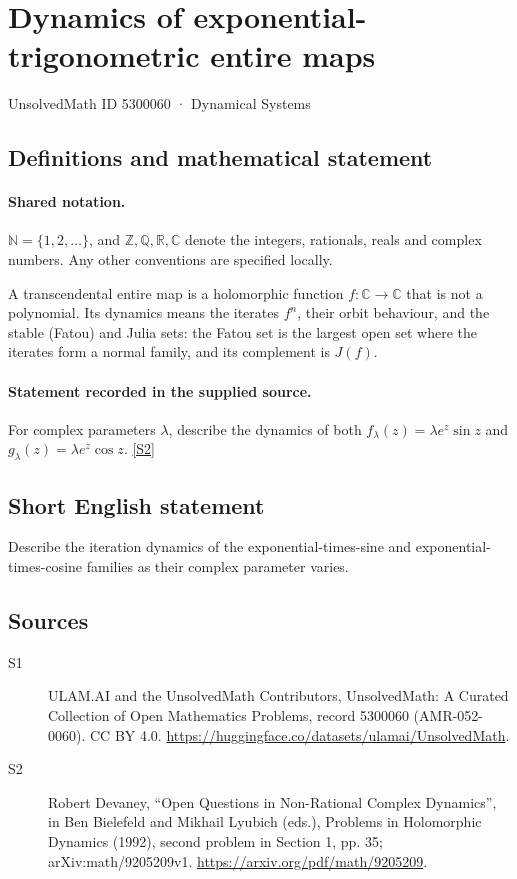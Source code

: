 \documentclass[11pt]{article}
\newcommand{\sref}[2]{\hyperlink{source:#1:#2}{[S#2]}}
\begin{document}
\setcounter{section}{5300059}
\section{Dynamics of exponential-trigonometric entire maps}\label{5300060}
{\small\sffamily UnsolvedMath ID 5300060 · Dynamical Systems}
\subsection{Definitions and mathematical statement}

\paragraph{Shared notation.}$\mathbb N=\{1,2,\ldots\}$, and $\mathbb Z,\mathbb Q,\mathbb R,\mathbb C$ denote the integers, rationals, reals and complex numbers. Any other conventions are specified locally.


A transcendental entire map is a holomorphic function $f:\mathbb C\to\mathbb C$ that is not a polynomial. Its dynamics means the iterates $f^n$, their orbit behaviour, and the stable (Fatou) and Julia sets: the Fatou set is the largest open set where the iterates form a normal family, and its complement is $J(f)$.
\paragraph{Statement recorded in the supplied source.}
For complex parameters $\lambda$, describe the dynamics of both $f_\lambda(z)=\lambda e^z\sin z$ and $g_\lambda(z)=\lambda e^z\cos z$. \sref{5300060}{2}
\subsection{Short English statement}
Describe the iteration dynamics of the exponential-times-sine and exponential-times-cosine families as their complex parameter varies.
\subsection{Sources}
\begin{description}
\item[\hypertarget{source:5300060:1}{S1}] ULAM.AI and the UnsolvedMath Contributors, UnsolvedMath: A Curated Collection of Open Mathematics Problems, record 5300060 (AMR-052-0060). CC BY 4.0. \url{https://huggingface.co/datasets/ulamai/UnsolvedMath}.
\item[\hypertarget{source:5300060:2}{S2}] Robert Devaney, ``Open Questions in Non-Rational Complex Dynamics'', in Ben Bielefeld and Mikhail Lyubich (eds.), Problems in Holomorphic Dynamics (1992), second problem in Section 1, pp. 35; arXiv:math/9205209v1. \url{https://arxiv.org/pdf/math/9205209}.
\end{description}
\label{end:5300060}
\end{document}

